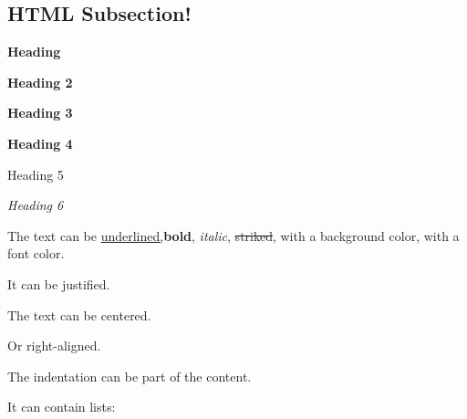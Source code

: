 \documentclass[letter,titlepage,oneside,11pt]{report}%
\begin{document}
\subsection{HTML Subsection!}%
\par%
\par%
\begin{FlushLeft}%
{\Huge \textbf{Heading}}%
\end{FlushLeft}%
\par%
\begin{FlushLeft}%
{\huge \textbf{Heading 2}}%
\end{FlushLeft}%
\par%
\begin{FlushLeft}%
{\LARGE \textbf{Heading 3}}%
\end{FlushLeft}%
\par%
\begin{FlushLeft}%
{\Large \textbf{Heading 4}}%
\end{FlushLeft}%
\par%
\begin{FlushLeft}%
{\Large Heading 5}%
\end{FlushLeft}%
\par%
\begin{FlushLeft}%
{\Large \textit{Heading 6}}%
\end{FlushLeft}%
\par%
\begin{FlushLeft}%
The text can be \underline{underlined,}\textbf{bold}, \textit{italic}, \sout{striked}, with a \colorbox[rgb]{0.8,0.8,0.0}{background color}, with a {\color[rgb]{0.5568627450980392,0.26666666666666666,0.6784313725490196}font color.}%
\end{FlushLeft}%
\par%
\begin{justify}%
It can be justified.%
\end{justify}%
\par%
\begin{Center}%
The text can be centered.%
\end{Center}%
\par%
\begin{FlushRight}%
Or right-aligned.%
\end{FlushRight}%
\par%
\begin{FlushLeft}%
The indentation can be part of the content.%
\end{FlushLeft}%
\par%
\begin{FlushLeft}%
It can contain lists:%
\end{FlushLeft}%
\end{document}
